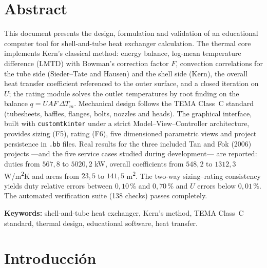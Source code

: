 \documentclass[11pt,a4paper]{article}
\begin{document}
\section{Abstract}

This document presents the design, formulation and validation of an
educational computer tool for shell-and-tube heat exchanger calculation. The
thermal core implements Kern's classical method: energy balance, log-mean
temperature difference (LMTD) with Bowman's correction factor $F$, convection
correlations for the tube side (Sieder--Tate and Hausen) and the shell side
(Kern), the overall heat transfer coefficient referenced to the outer surface,
and a closed iteration on $U$; the rating module solves the outlet
temperatures by root finding on the balance
$q = U A F \,\Delta T_m$. Mechanical design follows the TEMA Class~C standard
(tubesheets, baffles, flanges, bolts, nozzles and heads). The graphical
interface, built with \texttt{customtkinter} under a strict Model--View--Controller
architecture, provides sizing (F5), rating (F6), five dimensioned parametric
views and project persistence in \texttt{.bb} files. Real results for the three included Tan and Fok (2006) projects ---and the
five service cases studied during development--- are reported: duties from $567{,}8$ to $5020{,}2$ kW,
overall coefficients from $548{,}2$ to $1312{,}3$ W/m\textsuperscript{2}K and
areas from $23{,}5$ to $141{,}5$ m\textsuperscript{2}. The two-way sizing--rating
consistency yields duty relative errors between $0{,}10\,\%$ and $0{,}70\,\%$
and $U$ errors below $0{,}01\,\%$. The automated verification suite
(138 checks) passes completely.

\textbf{Keywords:} shell-and-tube heat exchanger, Kern's method, TEMA Class~C
standard, thermal design, educational software, heat transfer.

\section{Introducci\'on}
\end{document}
